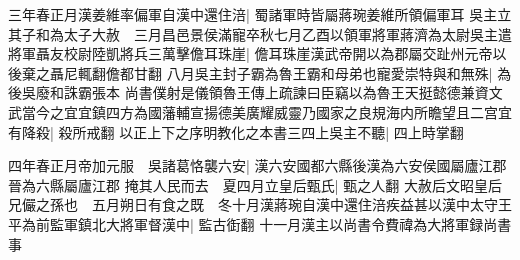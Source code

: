 三年春正月漢姜維率偏軍自漢中還住涪|{
	蜀諸軍時皆屬蔣琬姜維所領偏軍耳}
吳主立其子和為太子大赦　三月昌邑景侯滿寵卒秋七月乙酉以領軍將軍蔣濟為太尉吳主遣將軍聶友校尉陸凱將兵三萬擊儋耳珠崖|{
	儋耳珠崖漢武帝開以為郡屬交趾州元帝以後棄之聶尼輒翻儋都甘翻}
八月吳主封子霸為魯王霸和母弟也寵愛崇特與和無殊|{
	為後吳廢和誅霸張本}
尚書僕射是儀領魯王傳上疏諫曰臣竊以為魯王天挺懿德兼資文武當今之宜宜鎮四方為國藩輔宣揚德美廣耀威靈乃國家之良規海内所瞻望且二宫宜有降殺|{
	殺所戒翻}
以正上下之序明教化之本書三四上吳主不聽|{
	四上時掌翻}


四年春正月帝加元服　吳諸葛恪襲六安|{
	漢六安國都六縣後漢為六安侯國屬廬江郡晉為六縣屬廬江郡}
掩其人民而去　夏四月立皇后甄氏|{
	甄之人翻}
大赦后文昭皇后兄儼之孫也　五月朔日有食之既　冬十月漢蔣琬自漢中還住涪疾益甚以漢中太守王平為前監軍鎮北大將軍督漢中|{
	監古衘翻}
十一月漢主以尚書令費禕為大將軍録尚書事

